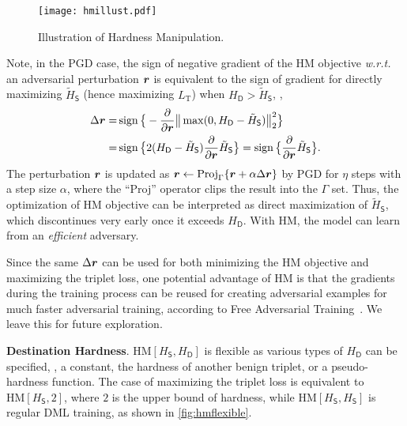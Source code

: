 \documentclass[10pt,twocolumn,letterpaper]{article}
\begin{document}
\begin{figure}
	\texttt{[image: hmillust.pdf]}
	\vspace{-1.8em}
	\caption{Illustration of Hardness Manipulation.}
	\label{fig:hm}
\end{figure}


Note, in the PGD case, the sign of negative gradient of the HM objective
\emph{w.r.t.} an adversarial perturbation ${\bm{r}}$ is equivalent to the sign of
gradient for directly maximizing $\tilde{H}_\mathsf{S}$ (hence
maximizing $L_\text{T}$) when $H_\mathsf{D}>\tilde{H}_\mathsf{S}$, \ie,
%
\begin{align}
	\Delta {\bm{r}}
	=&
	\operatorname{sign}\big\{
		-\frac{\partial}{\partial {\bm{r}}} \big\| \max(0, 
		H_\mathsf{D} - \tilde{H}_\mathsf{S} ) \big\|_2^2
	\big\}
	\\
	=&
	\operatorname{sign}\big\{
		2(H_\mathsf{D} - \tilde{H}_\mathsf{S})
		\frac{\partial }{\partial {\bm{r}}} \tilde{H}_\mathsf{S} \big\}
	=
	\operatorname{sign}\big\{
		\frac{\partial}{\partial {\bm{r}}} \tilde{H}_\mathsf{S}
		\big\}.
\end{align}
%
The perturbation ${\bm{r}}$ is updated as ${\bm{r}} \leftarrow \text{Proj}_\Gamma\{{\bm{r}} + \alpha \Delta
{\bm{r}}\}$ by PGD for $\eta$ steps with a step size $\alpha$, where the ``Proj'' operator
clips the result into the $\Gamma$ set.
%
Thus, the optimization of HM objective can be interpreted as direct
maximization of $\tilde{H}_\mathsf{S}$, which discontinues very early once it
exceeds $H_\mathsf{D}$.
%
With HM, the model can learn from an \emph{efficient} adversary.

Since the same $\Delta{\bm{r}}$ can be used for both minimizing the HM objective
and maximizing the triplet loss, one potential advantage of HM is that
the gradients during the training process can be reused for creating
adversarial examples for much faster adversarial training, according to 
Free Adversarial Training~\cite{freeat}.
%
We leave this for future exploration.


\textbf{Destination Hardness}.
%
$\text{HM}[H_\mathsf{S},H_\mathsf{D}]$ is flexible as various
types of $H_\mathsf{D}$ can be specified, \eg, a constant, the
hardness of another benign triplet, or a pseudo-hardness function.
%
The case of maximizing the triplet loss is equivalent to
$\text{HM}[H_\mathsf{S},2]$, where $2$ is the 
upper bound of hardness, while $\text{HM}[H_\mathsf{S},H_\mathsf{S}]$
is regular DML training, as shown in \cref{fig:hmflexible}.
\end{document}
